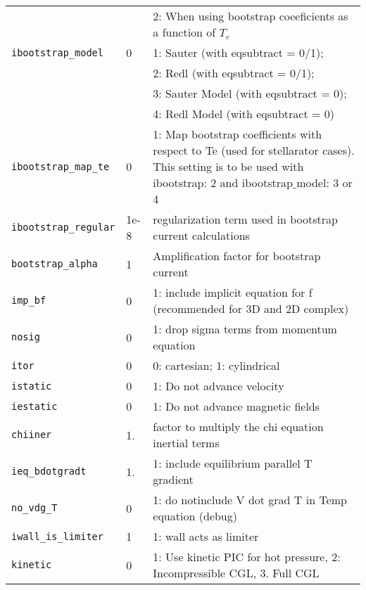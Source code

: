 \begin{tabular}{llp{4in}}
                      &   & 2: When using bootstrap coeeficients as a function of $T_e$ \\
  \texttt{ibootstrap\_model} & 0 & 1: Sauter (with eqsubtract = 0/1); \\
                             &   & 2: Redl (with eqsubtract = 0/1); \\
                             &   & 3: Sauter Model (with eqsubtract = 0); \\
                             &   & 4: Redl Model (with eqsubtract = 0) \\
  \texttt{ibootstrap\_map\_te} & 0 & 1: Map bootstrap coefficients with respect to Te
  (used for stellarator cases). This setting is to be used with ibootstrap: 2 and 
  ibootstrap$\_$model: 3 or 4\\
  \texttt{ibootstrap\_regular} & 1e-8 & regularization term used in bootstrap current calculations \\
  \texttt{bootstrap\_alpha} & 1 & Amplification factor for bootstrap current \\
  \texttt{imp\_bf} & 0 & 1: include implicit equation for f (recommended for
  3D and 2D complex) \\
  \texttt{nosig} & 0 & 1: drop sigma terms from momentum equation \\
  \texttt{itor}   & 0   & 0: cartesian; 1: cylindrical\\
  \texttt{istatic}& 0   & 1: Do not advance velocity\\
  \texttt{iestatic}&0   & 1: Do not advance magnetic fields\\
  \texttt{chiiner} & 1. & factor to multiply the chi equation inertial terms \\
  \texttt{ieq\_bdotgradt} & 1. & 1: include equilibrium parallel T gradient \\
  \texttt{no\_vdg\_T} & 0 & 1: do notinclude V dot grad T in Temp equation (debug) \\
  \texttt{iwall\_is\_limiter} & 1 & 1: wall acts as limiter \\
  \texttt{kinetic} & 0 & 1: Use kinetic PIC for hot pressure, 
                         2: Incompressible CGL,
                         3. Full CGL  
\end{tabular}

